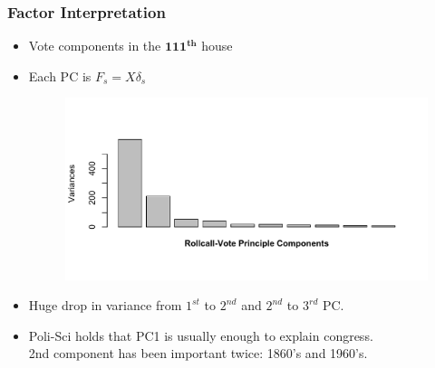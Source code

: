 \documentclass[
  shownotes,
  xcolor={svgnames},
  hyperref={colorlinks,citecolor=DarkBlue,linkcolor=DarkRed,urlcolor=DarkBlue}
  , aspectratio=169]{beamer}
\newcommand{\sg}{\color{DarkSlateGray}}
\newcommand{\bs}[1]{\boldsymbol{#1}}
\begin{document}
\begin{frame}[fragile]
\frametitle{Factor Interpretation}

\begin{itemize}

  \item Vote components in the $\bs{111^{th}}$ house
 
 \item Each PC is $F_s = X\delta_s$ 

  \begin{figure}[H] \centering
            \captionsetup{justification=centering}
              \includegraphics[scale=0.5]{figures/VOTEscree}
              
 \end{figure}

\item Huge drop in variance from $1^{st}$ to $2^{nd}$ and  $2^{nd}$ to $3^{rd}$ PC.
\item Poli-Sci holds that PC1 is usually enough to explain congress. \\\sg 2nd component has been important twice: 1860's and 1960's.

\end{itemize}


\end{frame}
\end{document}
